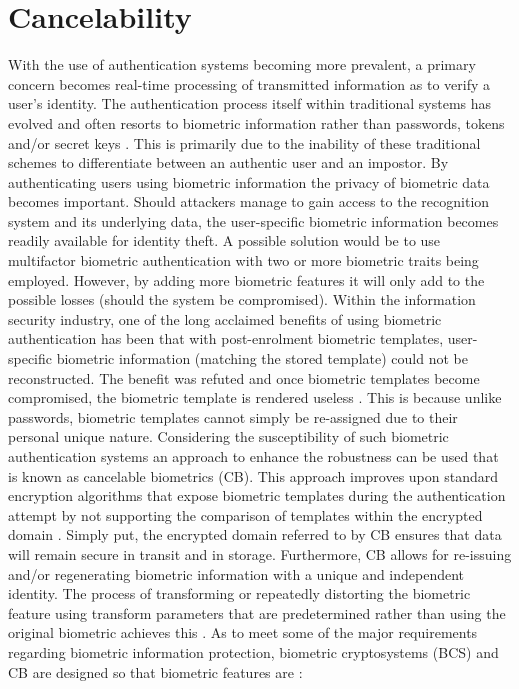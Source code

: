 \section[Cancelability]{Cancelability}
With the use of authentication systems becoming more prevalent, a primary concern becomes real-time processing of transmitted information as to verify a user’s identity. The authentication process itself within traditional systems has evolved and often resorts to biometric information rather than passwords, tokens and/or secret keys \cite{Verma2016}. This is primarily due to the inability of these traditional schemes to differentiate between an authentic user and an impostor. By authenticating users using biometric information the privacy of biometric data becomes important. Should attackers manage to gain access to the recognition system and its underlying data, the user-specific biometric information becomes readily available for identity theft. 
A possible solution would be to use multifactor biometric authentication with two or more biometric traits being employed. However, by adding more biometric features it will only add to the possible losses (should the system be compromised). Within the information security industry, one of the long acclaimed benefits of using biometric authentication has been that with post-enrolment biometric templates, user-specific biometric information (matching the stored template) could not be reconstructed. The benefit was refuted and once biometric templates become compromised, the biometric template is rendered useless \cite{Rathgeb2011}. This is because unlike passwords, biometric templates cannot simply be re-assigned due to their personal unique nature. Considering the susceptibility of such biometric authentication systems an approach to enhance the robustness can be used that is known as cancelable biometrics (CB). This approach improves upon standard encryption algorithms that expose biometric templates during the authentication attempt by not supporting the comparison of templates within the encrypted domain \cite{Rathgeb2011}. Simply put, the encrypted domain referred to by CB ensures that data will remain secure in transit and in storage. Furthermore, CB allows for re-issuing and/or regenerating biometric information with a unique and independent identity. The process of transforming or repeatedly distorting the biometric feature using transform parameters that are predetermined rather than using the original biometric achieves this \cite{Shahim2016}. As to meet some of the major requirements regarding biometric information protection, biometric cryptosystems (BCS) and CB are designed so that biometric features are \cite{Rathgeb2011, Verma2016}:

